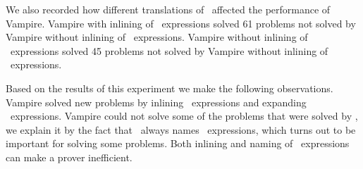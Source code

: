 We also recorded how different translations of \LETIN\ affected the performance of Vampire. Vampire with inlining of \LETIN\ expressions solved 61 problems not solved by Vampire without inlining of \LETIN\ expressions. Vampire without inlining of \LETIN\ expressions solved 45 problems not solved by Vampire without inlining of \LETIN\ expressions.

Based on the results of this experiment we make the following observations. Vampire solved new problems by inlining \LETIN\ expressions and expanding \ITE\ expressions. Vampire could not solve some of the problems that were solved by \oldcnfVampire, we explain it by the fact that \oldcnfVampire\ always names \ITE\ expressions, which turns out to be important for solving some problems. Both inlining and naming of \LETIN\ expressions can make a prover inefficient.